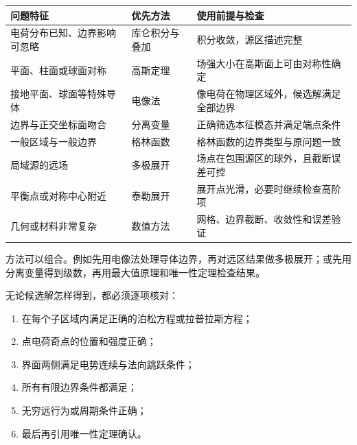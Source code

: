 {\def\LTcaptype{none} %
\begin{longtable}[]{@{}
  >{\raggedright\arraybackslash}p{}
  >{\raggedright\arraybackslash}p{}
  >{\raggedright\arraybackslash}p{}@{}}
\toprule\noalign{}
\begin{minipage}[b]{\linewidth}\raggedright
问题特征
\end{minipage} & \begin{minipage}[b]{\linewidth}\raggedright
优先方法
\end{minipage} & \begin{minipage}[b]{\linewidth}\raggedright
使用前提与检查
\end{minipage} \\
\midrule\noalign{}
\endhead
\bottomrule\noalign{}
\endlastfoot
电荷分布已知、边界影响可忽略 & 库仑积分与叠加 &
积分收敛，源区描述完整 \\
平面、柱面或球面对称 & 高斯定理 & 场强大小在高斯面上可由对称性确定 \\
接地平面、球面等特殊导体 & 电像法 &
像电荷在物理区域外，候选解满足全部边界 \\
边界与正交坐标面吻合 & 分离变量 & 正确筛选本征模态并满足端点条件 \\
一般区域与一般边界 & 格林函数 & 格林函数的边界类型与原问题一致 \\
局域源的远场 & 多极展开 & 场点在包围源区的球外，且截断误差可控 \\
平衡点或对称中心附近 & 泰勒展开 & 展开点光滑，必要时继续检查高阶项 \\
几何或材料非常复杂 & 数值方法 & 网格、边界截断、收敛性和误差验证 \\
\end{longtable}
}

方法可以组合。例如先用电像法处理导体边界，再对远区结果做多极展开；或先用分离变量得到级数，再用最大值原理和唯一性定理检查结果。

无论候选解怎样得到，都必须逐项核对：

\begin{enumerate}
\def\labelenumi{\arabic{enumi}.}
\tightlist
\item
  在每个子区域内满足正确的泊松方程或拉普拉斯方程；
\item
  点电荷奇点的位置和强度正确；
\item
  界面两侧满足电势连续与法向跳跃条件；
\item
  所有有限边界条件都满足；
\item
  无穷远行为或周期条件正确；
\item
  最后再引用唯一性定理确认。
\end{enumerate}

